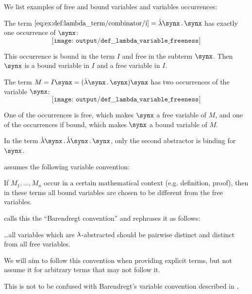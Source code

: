 \begin{example}\label{ex:def:lambda_variable_freeness}
  We list examples of free and bound variables and variables occurrences:
  \begin{thmenum}
     The term \( \ref{eq:ex:def:lambda_term/combinator/i} = \qabs \synx \synx \) has exactly one occurrence of \( \synx \):
    \begin{equation*}
      \texttt{[image: output/def\_\_lambda\_variable\_freeness]}
    \end{equation*}

     This occurrence is bound in the term \( I \) and free in the subterm \( \synx \). Then \( \synx \) is a bound variable in \( I \) and a free variable in \( I \).

     The term \( M = I \synx = (\qabs \synx \synx) \synx \) has two occurrences of the variable \( \synx \):
    \begin{equation*}
      \texttt{[image: output/def\_\_lambda\_variable\_freeness]}
    \end{equation*}

    One of the occurrences is free, which makes \( \synx \) a free variable of \( M \), and one of the occurrences if bound, which makes \( \synx \) a bound variable of \( M \).

     In the term \( \qabs \synx \qabs \synx \synx \), only the second abstractor is binding for \( \synx \).
  \end{thmenum}
\end{example}

\begin{remark}\label{rem:barendregt_variable_convention}
   assumes the following variable convention:
  \begin{displayquote}
    If \( M_1, \ldots, M_n \) occur in a certain mathematical context (e.g. definition, proof), then in these terms all bound variables are chosen to be different from the free variables.
  \end{displayquote}

   calls this the \enquote{Barendregt convention} and rephrases it as follows:
  \begin{displayquote}
    \ldots all variables which are \( {\mathrm \lambda} \)-abstracted should be pairwise distinct and distinct from all free variables.
  \end{displayquote}

  We will aim to follow this convention when providing explicit terms, but not assume it for arbitrary terms that may not follow it.
\end{remark}
\begin{comments}
  \item This is not to be confused with Barendregt's variable convention described in .
\end{comments}

